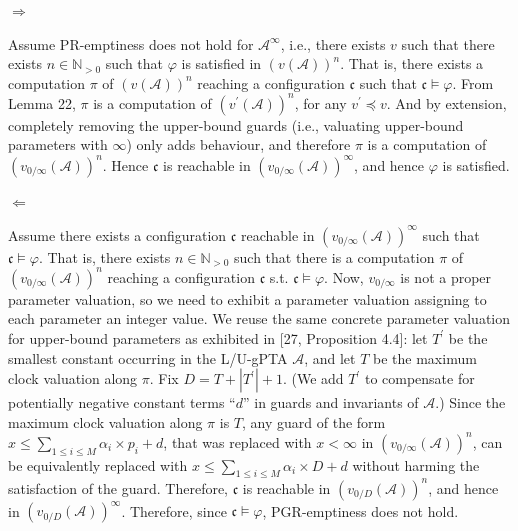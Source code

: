 \documentclass[10pt,a4paper]{article}
\begin{document}
 
  $\Rightarrow$  
 
Assume PR-emptiness does not hold for ${\mathcal{A}}^{\infty}$, i.e., there exists $v$ such that there exists $n\in\mathbb{N}_{>0}$ such that $\varphi$ is satisfied in ${(v(\mathcal{A}))}^{n}$. That is, there exists a computation $\pi$ of ${(v(\mathcal{A}))}^{n}$ reaching a configuration $\mathfrak{c}$ such that $\mathfrak{c}\models\varphi$. From Lemma 22, $\pi$ is a computation of ${(v^{\prime}(\mathcal{A}))}^{n}$, for any $v^{\prime}\preceq v$. And by extension, completely removing the upper-bound guards (i.e., valuating upper-bound parameters with $\infty$) only adds behaviour, and therefore $\pi$ is a computation of ${(v_{0/\infty}(\mathcal{A}))}^{n}$. Hence $\mathfrak{c}$ is reachable in ${(v_{0/\infty}(\mathcal{A}))}^{\infty}$, and hence $\varphi$ is satisfied.\par
 
  $\Leftarrow$  
 
Assume there exists a configuration $\mathfrak{c}$ reachable in ${(v_{0/\infty}(\mathcal{A}))}^{\infty}$ such that $\mathfrak{c}\models\varphi$. That is, there exists $n\in\mathbb{N}_{>0}$ such that there is a computation $\pi$ of ${(v_{0/\infty}(\mathcal{A}))}^{n}$ reaching a configuration $\mathfrak{c}$ s.t. $\mathfrak{c}\models\varphi$. Now, $v_{0/\infty}$ is not a proper parameter valuation, so we need to exhibit a parameter valuation assigning to each parameter an integer value. We reuse the same concrete parameter valuation for upper-bound parameters as exhibited in [27, Proposition 4.4]: let $T^{\prime}$ be the smallest constant occurring in the L/U-gPTA $\mathcal{A}$, and let $T$ be the maximum clock valuation along $\pi$. Fix $D=T+|T^{\prime}|+1$. (We add $T^{\prime}$ to compensate for potentially negative constant terms “$d$” in guards and invariants of $\mathcal{A}$.) Since the maximum clock valuation along $\pi$ is $T$, any guard of the form $x\leq\sum_{1\leq i\leq M}\alpha_{i}\times p_{i}+d$, that was replaced with $x<\infty$ in ${(v_{0/\infty}(\mathcal{A}))}^{n}$, can be equivalently replaced with $x\leq\sum_{1\leq i\leq M}\alpha_{i}\times D+d$ without harming the satisfaction of the guard. Therefore, $\mathfrak{c}$ is reachable in ${(v_{0/D}(\mathcal{A}))}^{n}$, and hence in ${(v_{0/D}(\mathcal{A}))}^{\infty}$. Therefore, since $\mathfrak{c}\models\varphi$, PGR-emptiness does not hold.\par
 
\end{document}
